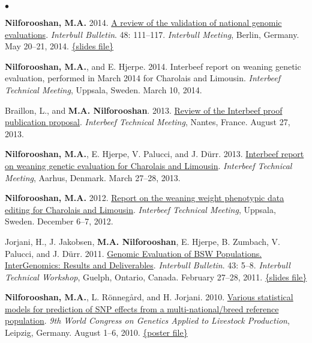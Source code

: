 \documentclass[margin,line]{res}
\newenvironment{list2}{
  \begin{list}{$\bullet$}{%
      \setlength{\itemsep}{0in}
      \setlength{\parsep}{0in} \setlength{\parskip}{0in}
      \setlength{\topsep}{0in} \setlength{\partopsep}{0in}
      \setlength{\leftmargin}{0.2in}}}{\end{list}}
\begin{document}
\begin{resume}
\begin{list2}
    \item {\bf Nilforooshan, M.A.} 2014. \href{https://www.researchgate.net/publication/358198989_A_Review_of_the_Validation_of_National_Genomic_Evaluations}{A review of the validation of national genomic evaluations}. {\em Interbull Bulletin}. 48: 111--117. {\em Interbull Meeting}, Berlin, Germany. May 20--21, 2014. \href{https://drive.google.com/file/d/0B2l_izQwJmVpdmxrUjF5WGc1X3c/view?usp=sharing&resourcekey=0-OBCPGDhhf3PpkbQL_lwMXg}{\{slides file\}}
    \item {\bf Nilforooshan, M.A.}, and E. Hjerpe. 2014. Interbeef report on weaning genetic evaluation, performed in March 2014 for Charolais and Limousin. {\em Interbeef Technical Meeting}, Uppsala, Sweden. March 10, 2014.
    \item Braillon, L., and {\bf M.A. Nilforooshan}. 2013. \href{https://drive.google.com/file/d/0B2l_izQwJmVpYWE2VndwNGhJblU/view?usp=sharing&resourcekey=0-lK2OKh6je4O4Dz_z0I9jJg}{Review of the Interbeef proof publication proposal}. {\em Interbeef Technical Meeting}, Nantes, France. August 27, 2013.
    \item {\bf Nilforooshan, M.A.}, E. Hjerpe, V. Palucci, and J. D\"{u}rr. 2013. \href{https://drive.google.com/file/d/0B2l_izQwJmVpZ2RRcXc0bS11RmM/view?usp=sharing&resourcekey=0-mJU9o7o9WqG3XXCrFYq9Xw}{Interbeef report on weaning genetic evaluation for Charolais and Limousin}. {\em Interbeef Technical Meeting}, Aarhus, Denmark. March 27--28, 2013.
    \item {\bf Nilforooshan, M.A.} 2012. \href{https://drive.google.com/file/d/0B2l_izQwJmVpLVY5NU1UZGR6czA/view?usp=sharing&resourcekey=0-z2Uuf8hnh-P_CXmZJ6iNXw}{Report on the weaning weight phenotypic data editing for Charolais and Limousin}. {\em Interbeef Technical Meeting}, Uppsala, Sweden. December 6--7, 2012.
    \item Jorjani, H., J. Jakobsen, {\bf M.A. Nilforooshan}, E. Hjerpe, B. Zumbach, V. Palucci, and J. D\"{u}rr. 2011. \href{https://www.researchgate.net/publication/265218200_Genomic_Evaluation_of_BSW_Populations_InterGenomics_Results_and_Deliverables}{Genomic Evaluation of BSW Populations. InterGenomics: Results and Deliverables}. {\em Interbull Bulletin}. 43: 5--8. {\em Interbull Technical Workshop}, Guelph, Ontario, Canada. February 27--28, 2011. \href{https://drive.google.com/file/d/0B2l_izQwJmVpbGh3ZC1iRWhCWVE/view?usp=sharing&resourcekey=0-BFevbAqrR4lVT5anezUffQ}{\{slides file\}}
    \item {\bf Nilforooshan, M.A.}, L. R\"{o}nneg\r{a}rd, and H. Jorjani. 2010. \href{https://www.researchgate.net/publication/267973054_Various_Statistical_Models_For_Prediction_Of_SNP_Effects_From_A_Multi-NationalBreed_Reference_Population}{Various statistical models for prediction of SNP effects from a multi-national/breed reference population}. {\em 9th World Congress on Genetics Applied to Livestock Production}, Leipzig, Germany. August 1--6, 2010. \href{https://doi.org/10.13140/RG.2.2.36673.22881}{\{poster file\}}

\end{list2}
\end{resume}
\end{document}
